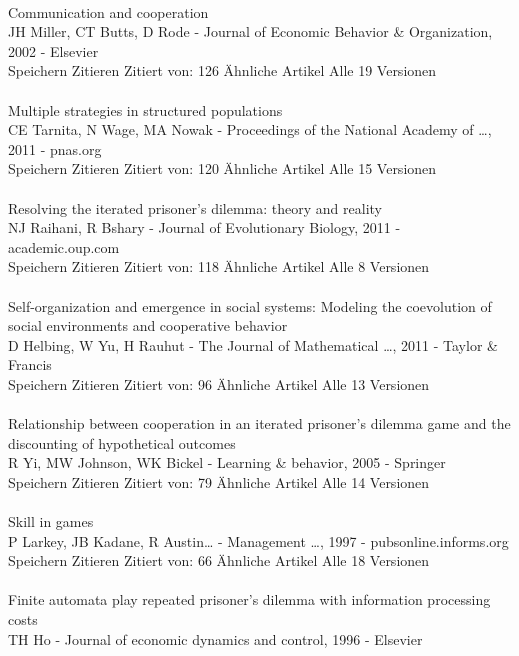 \documentclass[11pt]{article}
\begin{document}
\\
\noindent 
[HTML] Communication and cooperation\\
JH Miller, CT Butts, D Rode - Journal of Economic Behavior \& Organization, 2002 - Elsevier\\
Speichern Zitieren Zitiert von: 126 Ähnliche Artikel Alle 19 Versionen\\
\\
\noindent 
Multiple strategies in structured populations\\
CE Tarnita, N Wage, MA Nowak - Proceedings of the National Academy of …, 2011 - pnas.org\\
Speichern Zitieren Zitiert von: 120 Ähnliche Artikel Alle 15 Versionen\\
\\
\noindent 
Resolving the iterated prisoner's dilemma: theory and reality\\
NJ Raihani, R Bshary - Journal of Evolutionary Biology, 2011 - academic.oup.com\\
Speichern Zitieren Zitiert von: 118 Ähnliche Artikel Alle 8 Versionen\\
\\
\noindent 
Self-organization and emergence in social systems: Modeling the coevolution of social environments and cooperative behavior\\
D Helbing, W Yu, H Rauhut - The Journal of Mathematical …, 2011 - Taylor \& Francis\\
Speichern Zitieren Zitiert von: 96 Ähnliche Artikel Alle 13 Versionen\\
\\
\noindent 
Relationship between cooperation in an iterated prisoner's dilemma game and the discounting of hypothetical outcomes\\
R Yi, MW Johnson, WK Bickel - Learning \& behavior, 2005 - Springer\\
Speichern Zitieren Zitiert von: 79 Ähnliche Artikel Alle 14 Versionen\\
\\
\noindent 
Skill in games\\
P Larkey, JB Kadane, R Austin… - Management …, 1997 - pubsonline.informs.org\\
Speichern Zitieren Zitiert von: 66 Ähnliche Artikel Alle 18 Versionen\\
\\
\noindent 
Finite automata play repeated prisoner's dilemma with information processing costs\\
TH Ho - Journal of economic dynamics and control, 1996 - Elsevier\\
\end{document}
